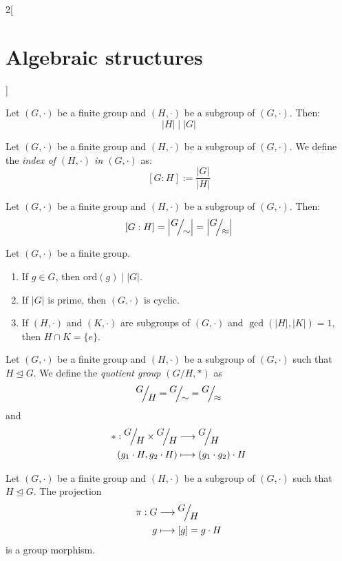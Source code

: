 \documentclass[../../../main.tex]{subfiles}
\begin{document}
\begin{multicols}{2}[\section{Algebraic structures}]
\begin{prop}
    \end{prop}
    \begin{theorem}
        Let $(G,\cdot)$ be a finite group and $(H,\cdot)$ be a subgroup of $(G,\cdot)$. Then: $$|H|\mid|G|$$
    \end{theorem}
    \begin{definition}
        Let $(G,\cdot)$ be a finite group and $(H,\cdot)$ be a subgroup of $(G,\cdot)$. We define the \textit{index of $(H,\cdot)$ in $(G,\cdot)$} as: $$[G:H]:=\frac{|G|}{|H|}$$
    \end{definition}
    \begin{corollary}
        Let $(G,\cdot)$ be a finite group and $(H,\cdot)$ be a subgroup of $(G,\cdot)$. Then: $$[G:H]=\left|\quot{G}{\sim}\right|=\left|\quot{G}{\approx}\right|$$
    \end{corollary}
    \begin{corollary}
        Let $(G,\cdot)$ be a finite group.
        \begin{enumerate}
            \item If $g\in G$, then $\text{ord}(g)\mid |G|$.
            \item If $|G|$ is prime, then $(G,\cdot)$ is cyclic.
            \item If $(H,\cdot)$ and $(K,\cdot)$ are subgroups of $(G,\cdot)$ and $\gcd(|H|,|K|)=1$, then $H\cap K=\{e\}$.
        \end{enumerate}
    \end{corollary}
    \begin{definition}
        Let $(G,\cdot)$ be a finite group and $(H,\cdot)$ be a subgroup of $(G,\cdot)$ such that $H\unlhd G$. We define the \textit{quotient group $\left(G/H,*\right)$} as $$\quot{G}{H}=\quot{G}{\sim}=\quot{G}{\approx}$$ and
        \begin{align*}
            *:\quot{G}{H}\times\quot{G}{H} & \longrightarrow\quot{G}{H}        \\
            (g_1\cdot H,g_2\cdot H)        & \longmapsto (g_1\cdot g_2)\cdot H
        \end{align*}
    \end{definition}
    \begin{lemma}
        Let $(G,\cdot)$ be a finite group and $(H,\cdot)$ be a subgroup of $(G,\cdot)$ such that $H\unlhd G$. The projection
        \begin{align*}
            \pi:G & \longrightarrow\quot{G}{H} \\
            g     & \longmapsto[g]=g\cdot H
        \end{align*}
        is a group morphism.
    \end{lemma}

\end{multicols}
\end{document}
